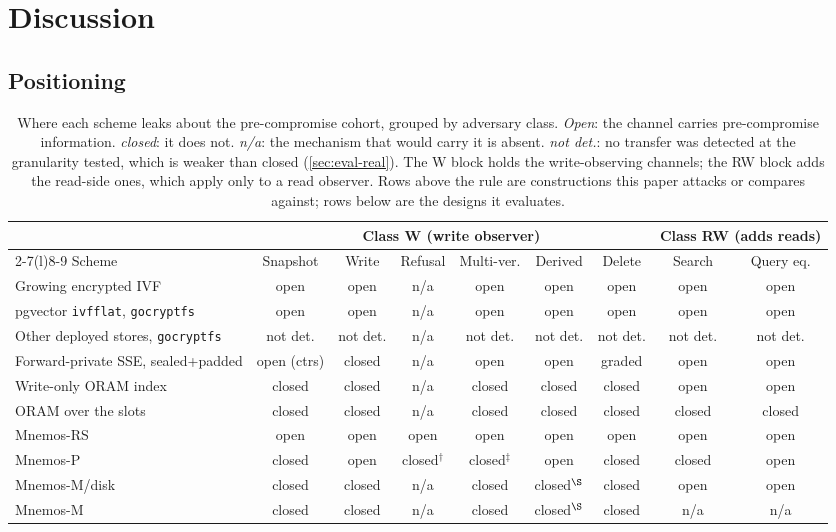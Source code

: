 \section{Discussion}
\label{sec:discussion}

\subsection{Positioning}

\begin{table}[t]
\centering
\caption{Where each scheme leaks about the pre-compromise cohort, grouped by adversary class.
\emph{Open}: the channel carries pre-compromise information. \emph{closed}: it does not.
\emph{n/a}: the mechanism that would carry it is absent. \emph{not det.}: no transfer was detected
at the granularity tested, which is weaker than closed (\cref{sec:eval-real}). The W block holds the
write-observing channels; the RW block adds the read-side ones, which apply only to a read observer.
Rows above the rule are constructions this paper attacks or compares against; rows below are the
designs it evaluates.}
\label{tab:crossscheme}
\footnotesize
\setlength{\tabcolsep}{4pt}
\begin{tabular}{lcccccc@{\hskip 10pt}cc}
\toprule
& \multicolumn{6}{c}{Class W (write observer)} & \multicolumn{2}{c}{Class RW (adds reads)} \\
\cmidrule(lr){2-7}\cmidrule(l){8-9}
Scheme & Snapshot & Write & Refusal & Multi-ver. & Derived & Delete & Search & Query eq. \\
\midrule
Growing encrypted IVF & open & open & n/a & open & open & open & open & open \\
pgvector \texttt{ivfflat}, \texttt{gocryptfs} & open & open & n/a & open & open & open & open & open \\
Other deployed stores, \texttt{gocryptfs} & not det. & not det. & n/a & not det. & not det. & not det. & not det. & not det. \\
Forward-private SSE, sealed+padded & open (ctrs) & closed & n/a & open & open & graded & open & open \\
Write-only ORAM index & closed & closed & n/a & closed & closed & closed & open & open \\
ORAM over the slots & closed & closed & n/a & closed & closed & closed & closed & closed \\
\midrule
Mnemos-RS & open & open & open & open & open & open & open & open \\
Mnemos-P & closed & open & closed$^\dagger$ & closed$^\ddagger$ & open & closed & closed & open \\
Mnemos-M/disk & closed & closed & n/a & closed & closed$^\S$ & closed & open & open \\
Mnemos-M & closed & closed & n/a & closed & closed$^\S$ & closed & n/a & n/a \\
\bottomrule
\end{tabular}


\end{table}
